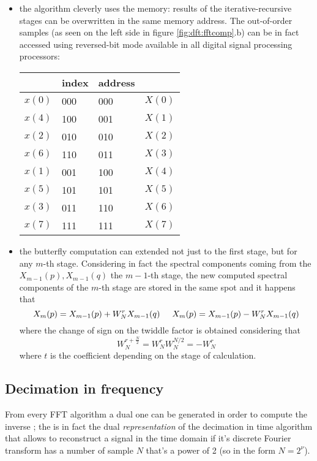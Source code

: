 		\begin{itemize}
			\item the algorithm cleverly uses the memory: results of the iterative-recursive stages can be overwritten in the same memory address. The out-of-order samples (as seen on the left side in figure \ref{fig:dft:fftcomp}.b) can be in fact accessed using reversed-bit mode available in all digital signal processing processors:
			\begin{center}
			\begin{tabular}{ M{1cm} M{1.3cm} M{1.3cm} M{1cm} }
				& index & address & \\ \hline
				$x(0)$ & 000 & 000 & $X(0)$ \\ 
				$x(4)$ & 100 & 001 & $X(1)$ \\
				$x(2)$ & 010 & 010 & $X(2)$ \\
				$x(6)$ & 110 & 011 & $X(3)$ \\
				$x(1)$ & 001 & 100 & $X(4)$ \\
				$x(5)$ & 101 & 101 & $X(5)$ \\
				$x(3)$ & 011 & 110 & $X(6)$ \\
				$x(7)$ & 111 & 111 & $X(7)$
			\end{tabular}
			\end{center}
			
			\item the butterfly computation can extended not just to the first stage, but for any $m$-th stage. Considering in fact the spectral components coming from the $X_{m-1}(p),X_{m-1}(q)$ the $m-1$-th stage, the new computed spectral components of the $m$-th stage are stored in the same spot and it happens that
			\begin{equation}
				X_m(p) = X_{m-1}(p) + W_N^r X_{m-1}(q) \hspace{0.5cm} X_m(p) = X_{m-1}(p) - W_N^r X_{m-1}(q)
			\end{equation}
			where the change of sign on the twiddle factor is obtained considering that
			\[ W_N^{r+ \frac N2} = W_N^r W_N^{N/2} = - W_N^r \]
			where $t$ is the coefficient depending on the stage of calculation.
		\end{itemize}
	
	\subsection{Decimation in frequency}
		
		From every FFT algorithm a dual one can be generated in order to compute the inverse \fft; the  is in fact the dual \textit{representation} of the decimation in time algorithm that allows to reconstruct a signal in the time domain if it's discrete Fourier transform has a number of sample $N$ that's a power of 2 (so in the form $N=2^\nu$).
		
